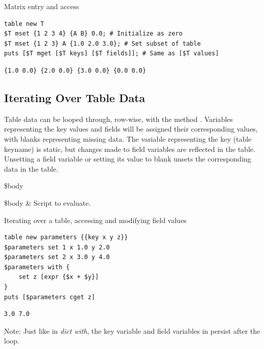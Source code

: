 \begin{example}{Matrix entry and access}
\begin{lstlisting}
table new T
$T mset {1 2 3 4} {A B} 0.0; # Initialize as zero
$T mset {1 2 3} A {1.0 2.0 3.0}; # Set subset of table
puts [$T mget [$T keys] [$T fields]]; # Same as [$T values]
\end{lstlisting}
\tcblower
\begin{lstlisting}
{1.0 0.0} {2.0 0.0} {3.0 0.0} {0.0 0.0}
\end{lstlisting}
\end{example}

\clearpage

\subsection{Iterating Over Table Data}
Table data can be looped through, row-wise, with the method . 
Variables representing the key values and fields will be assigned their corresponding values, with blanks representing missing data. 
The variable representing the key (table keyname) is static, but changes made to field variables are reflected in the table. 
Unsetting a field variable or setting its value to blank unsets the corresponding data in the table. 
\begin{syntax}
 \$body
\end{syntax}
\begin{args}
\$body & Script to evaluate.
\end{args}
\begin{example}{Iterating over a table, accessing and modifying field values}
\begin{lstlisting}
table new parameters {{key x y z}}
$parameters set 1 x 1.0 y 2.0
$parameters set 2 x 3.0 y 4.0
$parameters with {
    set z [expr {$x + $y}]
}
puts [$parameters cget z]
\end{lstlisting}
\tcblower
\begin{lstlisting}
3.0 7.0
\end{lstlisting}
\end{example}
Note: Just like in \textit{dict with}, the key variable and field variables in  persist after the loop.
\clearpage
